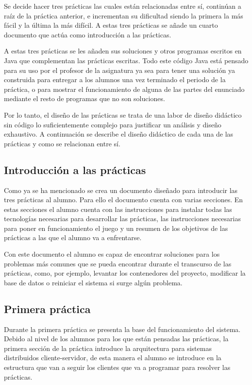 Se decide hacer tres prácticas las cuales están relacionadas entre sí, continúan a raíz de la práctica anterior, e incrementan su dificultad siendo la primera la más fácil y la última la más difícil. A estas tres prácticas se añade un cuarto documento que actúa como introducción a las prácticas.

A estas tres prácticas se les añaden sus soluciones y otros programas escritos en Java que complementan las prácticas escritas. Todo este código Java está pensado para su uso por el profesor de la asignatura ya sea para tener una solución ya construida para entregar a los alumnos una vez terminado el periodo de la práctica, o para mostrar el funcionamiento de alguna de las partes del enunciado mediante el resto de programas que no son soluciones.

Por lo tanto, el diseño de las prácticas se trata de una labor de diseño didáctico sin código lo suficientemente complejo para justificar un análisis y diseño exhaustivo. A continuación se describe el diseño didáctico de cada una de las prácticas y como se relacionan entre sí.

\subsection{Introducción a las prácticas}

Como ya se ha mencionado se crea un documento diseñado para introducir las tres prácticas al alumno. Para ello el documento cuenta con varias secciones. En estas secciones el alumno cuenta con las instrucciones para instalar todas las tecnologías necesarias para desarrollar las prácticas, las instrucciones necesarias para poner en funcionamiento el juego y un resumen de los objetivos de las prácticas a las que el alumno va a enfrentarse.

Con este documento el alumno es capaz de encontrar soluciones para los problemas más comunes que se pueda encontrar durante el transcurso de las prácticas, como, por ejemplo, levantar los contenedores del proyecto, modificar la base de datos o reiniciar el sistema si surge algún problema.

\subsection{Primera práctica}

Durante la primera práctica se presenta la base del funcionamiento del sistema. Debido al nivel de los alumnos para los que están pensadas las prácticas, la primera sección de la práctica introduce la arquitectura para sistemas distribuidos cliente-servidor, de esta manera el alumno se introduce en la estructura que van a seguir los clientes que va a programar para resolver las prácticas.

